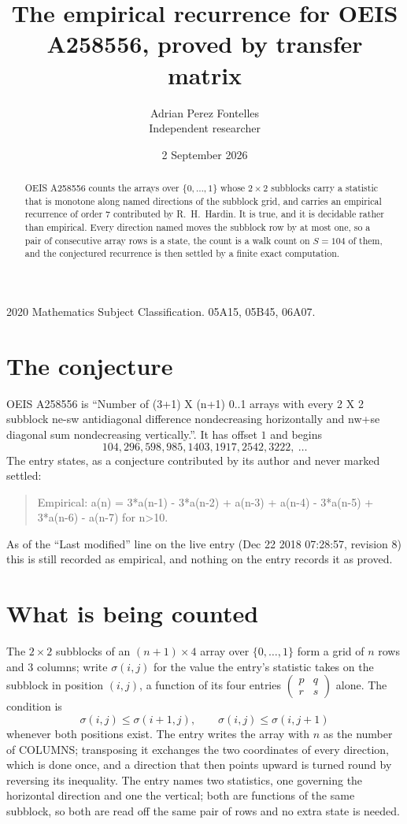 \documentclass[11pt,a4paper]{article}
\title{The empirical recurrence for OEIS A258556, proved by transfer matrix}
\author{Adrian Perez Fontelles\\ \small Independent researcher}
\date{2 September 2026}
\theoremstyle{plain}
\theoremstyle{definition}
\begin{document}
\maketitle

\begin{abstract}
OEIS A258556 counts the arrays over $\{0,\dots,1\}$ whose $2\times2$ subblocks carry a
statistic that is monotone along named directions of the subblock grid, and carries an
empirical recurrence of order $7$ contributed by R.~H.~Hardin. It is true, and it is
decidable rather than empirical. Every direction named moves the subblock row by at most one,
so a pair of consecutive array rows is a state, the count is a walk count on $S=104$ of them,
and the conjectured recurrence is then settled by a finite exact computation.
\end{abstract}

\noindent\small 2020 Mathematics Subject Classification. 05A15, 05B45, 06A07.\normalsize

\section{The conjecture}

OEIS A258556 is ``Number of (3+1) X (n+1) 0..1 arrays with every 2 X 2 subblock ne-sw antidiagonal difference nondecreasing horizontally and nw+se diagonal sum nondecreasing vertically.''. It has offset $1$ and begins
\[
104, 296, 598, 985, 1403, 1917, 2542, 3222,\ \dots
\]
The entry states, as a conjecture contributed by its author and never marked settled:
\begin{quote}
Empirical: a(n) = 3*a(n-1) - 3*a(n-2) + a(n-3) + a(n-4) - 3*a(n-5) + 3*a(n-6) - a(n-7) for n>10.
\end{quote}
As of the ``Last modified'' line on the live entry (Dec 22 2018 07:28:57, revision 8) this is still
recorded as empirical, and nothing on the entry records it as proved.

\section{What is being counted}

The $2\times2$ subblocks of an $(n+1)\times4$ array over $\{0,\dots,1\}$ form a grid
of $n$ rows and $3$ columns; write $\sigma(i,j)$ for the value the entry's statistic takes on
the subblock in position $(i,j)$, a function of its four entries
$\begin{pmatrix}p&q\\r&s\end{pmatrix}$ alone. The condition is
\[
\sigma(i,j)\le\sigma(i+1,j),\qquad \sigma(i,j)\le\sigma(i,j+1)
\]
whenever both positions exist. The entry writes the array with $n$ as the number of COLUMNS; transposing it exchanges the two coordinates of every direction, which is done once, and a direction that then points upward is turned round by reversing its inequality. The entry names two statistics, one governing the horizontal direction and one the vertical; both are functions of the same subblock, so both are read off the same pair of rows and no extra state is needed.
\end{document}
